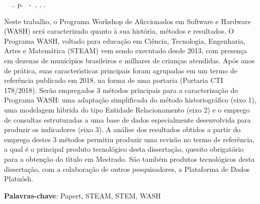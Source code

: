 \setlength{\absparsep}{18pt} %
\begin{resumo}
\begin{flushleft} 
\setlength{\absparsep}{0pt} %
\SingleSpacing 
\imprimirautorabr~~\textbf{\imprimirtituloresumo}.\imprimirdata. \pageref{LastPage}p. 
\imprimirtipotrabalho~-~\imprimirinstituicao, \imprimirlocal, \imprimirdata. 
 \end{flushleft}
\OnehalfSpacing 
Neste trabalho, o Programa Workshop de Aficcionados em Software e Hardware (WASH) ser\'a caracterizado quanto \`a sua hist\'oria, m\'etodos e resultados. O Programa WASH, voltado para educa\c{c}\~ao em Ci\^encia, Tecnologia, Engenharia, Artes e Matem\'atica (STEAM) vem sendo executado desde 2013, com presen\c{c}a em dezenas de munic\'{\i}pios brasileiros e milhares de crian\c{c}as atendidas. Ap\'os anos de pr\'atica, suas caracter\'{\i}sticas principais foram agrupadas em um termo de refer\^encia publicado em 2018, na forma de uma portaria (Portaria CTI 178/2018). Ser\~ao empregados 3 m\'etodos principais para a caracteriza\c{c}\~ao do Programa WASH: uma adapta\c{c}\~ao simplificada do m\'etodo historiogr\'afico (eixo 1), uma modelagem h\'{\i}brida do tipo Entidade Relacionamento (eixo 2) e o emprego de consultas estruturadas a uma base de dados especialmente desenvolvida para produzir os indicadores (eixo 3). A an\'alise dos resultados obtidos a partir do emprego destes 3 m\'etodos permitiu produzir uma revis\~ao no termo de refer\^encia, a qual \'e o principal produto tecnol\'ogico desta disserta\c{c}\~ao, quesito obrigat\'orio para a obten\c{c}\~ao do t\'{\i}tulo em Mestrado. S\~ao tamb\'em produtos tecnol\'ogicos desta disserta\c{c}\~ao, com a colabora\c{c}\~ao de outros pesquisadores, a Plataforma de Dados Platu\'osh.
 

 \textbf{Palavras-chave}: Papert, STEAM, STEM, WASH
\end{resumo}